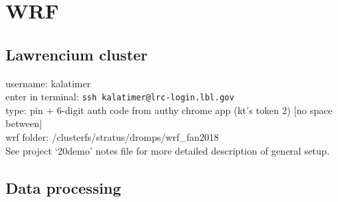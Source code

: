 \documentclass{article}
\begin{document}
\section{WRF}
		\subsection{Lawrencium cluster}
		username: kalatimer\\
		enter in terminal: \texttt{ssh kalatimer@lrc-login.lbl.gov}\\
		type: pin + 6-digit auth code from authy chrome app (kt's token 2) [no space between]\\
		wrf folder: /clusterfs/stratus/dromps/wrf\_fan2018\\
		See project `20demo' notes file for more detailed description of general setup.
		\subsection{Data processing}
\end{document}
